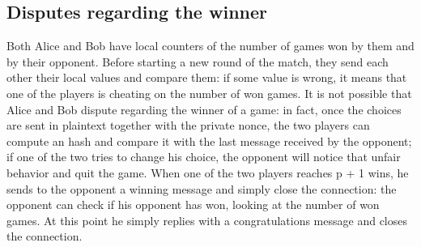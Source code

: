 \documentclass[11 pt]{article}
\begin{document}
\subsection{Disputes regarding the winner}
Both Alice and Bob have local counters of the number of games won by them and by their opponent. Before starting a new round of the match, they send each other their local values and compare them: if some value is wrong, it means that one of the players is cheating on the number of won games. It is not possible that Alice and Bob dispute regarding the winner of a game: in fact, once the choices are sent in plaintext together with the private nonce, the two players can compute an hash and compare it with the last message received by the opponent; if one of the two tries to change his choice, the opponent will notice that unfair behavior and quit the game. When one of the two players reaches p + 1 wins, he sends to the opponent a winning message and simply close the connection: the opponent can check if his opponent has won, looking at the number of won games. At this point he simply replies with a congratulations message and closes the connection.
\end{document}
